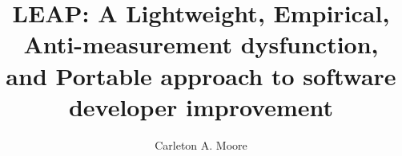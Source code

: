 \documentclass[11pt,times,dissertation,proposal]{uhthesis2e} %
\begin{document}
\title{LEAP:  A Lightweight, Empirical, Anti-measurement dysfunction, 
  and Portable approach to software developer improvement}
\author{Carleton A. Moore}
\othermembers{ }

\maketitle

\signaturepage

\tableofcontents
\newpage
\listoffigures
\newpage
\listoftables
\newpage

%
\newpage










\appendix
%
%


\end{document}
